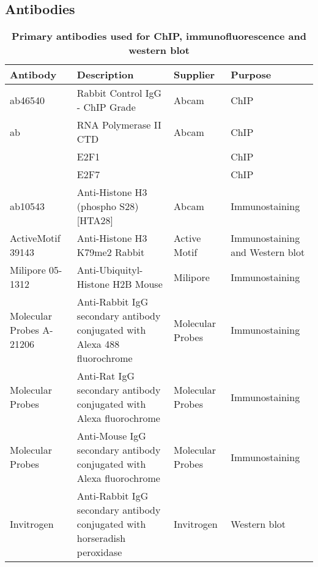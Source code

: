 \documentclass[11pt,twoside,a4paper]{report}
\begin{document}
		\subsection{Antibodies}
			\begin{table}[H]
       		\caption{\bf{Primary antibodies used for ChIP, immunofluorescence and western blot}}
        		\begin{center}
            		\begin{tabular}{| p{2cm} | p{8cm} | p{3cm} | p{3cm} |}
                		\hline
	                	\textbf{Antibody} & \textbf{Description} & \textbf{Supplier} & \textbf{Purpose}\\
    		            \hline
        		        ab46540 & Rabbit Control IgG - ChIP Grade & Abcam & ChIP\\
        		        \hline
            		    ab & RNA Polymerase II CTD & Abcam & ChIP\\
            		    \hline
            		     & E2F1 & & ChIP\\
            		     \hline
						 & E2F7 & & ChIP\\
						 \hline
            		    ab10543 & Anti-Histone H3 (phospho S28) [HTA28] & Abcam & Immunostaining\\
            		    \hline
            		    ActiveMotif 39143  & Anti-Histone H3 K79me2 Rabbit & Active Motif & Immunostaining and Western blot\\
            		    \hline
            		    Milipore 05-1312  &  Anti-Ubiquityl-Histone H2B Mouse & Milipore & Immunostaining\\
            		    \hline
            		    \hline
            		    Molecular Probes A-21206 & Anti-Rabbit IgG secondary antibody conjugated with Alexa 488 fluorochrome &  Molecular Probes & Immunostaining\\            		    
            		    \hline
            		    Molecular Probes       & Anti-Rat IgG secondary antibody conjugated with Alexa  fluorochrome &  Molecular Probes & Immunostaining\\
            		    \hline
            		    Molecular Probes       & Anti-Mouse IgG secondary antibody conjugated with Alexa  fluorochrome &  Molecular Probes & Immunostaining\\
            		    \hline
            		    Invitrogen       & Anti-Rabbit IgG secondary antibody conjugated with horseradish peroxidase &  Invitrogen & Western blot\\
            		    \hline
	            \end{tabular}
    		    \end{center}
		    \end{table}
		  
\end{document}
